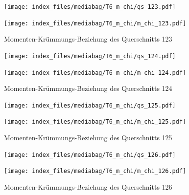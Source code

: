\documentclass[
  11pt,
  letterpaper,
]{scrreprt}
\begin{document}
\begin{figure}[H]

\begin{minipage}{0.50\linewidth}
\texttt{[image: index\_files/mediabag/T6\_m\_chi/qs\_123.pdf]}\end{minipage}%
%
\begin{minipage}{0.50\linewidth}
\texttt{[image: index\_files/mediabag/T6\_m\_chi/m\_chi\_123.pdf]}\end{minipage}%

\caption{\label{fig-mchi_anhang}Momenten-Krümmungs-Beziehung des
Querschnitts 123}

\end{figure}%

\begin{figure}[H]

\begin{minipage}{0.50\linewidth}
\texttt{[image: index\_files/mediabag/T6\_m\_chi/qs\_124.pdf]}\end{minipage}%
%
\begin{minipage}{0.50\linewidth}
\texttt{[image: index\_files/mediabag/T6\_m\_chi/m\_chi\_124.pdf]}\end{minipage}%

\caption{\label{fig-mchi_anhang}Momenten-Krümmungs-Beziehung des
Querschnitts 124}

\end{figure}%

\begin{figure}[H]

\begin{minipage}{0.50\linewidth}
\texttt{[image: index\_files/mediabag/T6\_m\_chi/qs\_125.pdf]}\end{minipage}%
%
\begin{minipage}{0.50\linewidth}
\texttt{[image: index\_files/mediabag/T6\_m\_chi/m\_chi\_125.pdf]}\end{minipage}%

\caption{\label{fig-mchi_anhang}Momenten-Krümmungs-Beziehung des
Querschnitts 125}

\end{figure}%

\begin{figure}[H]

\begin{minipage}{0.50\linewidth}
\texttt{[image: index\_files/mediabag/T6\_m\_chi/qs\_126.pdf]}\end{minipage}%
%
\begin{minipage}{0.50\linewidth}
\texttt{[image: index\_files/mediabag/T6\_m\_chi/m\_chi\_126.pdf]}\end{minipage}%

\caption{\label{fig-mchi_anhang}Momenten-Krümmungs-Beziehung des
Querschnitts 126}

\end{figure}%
\end{document}
